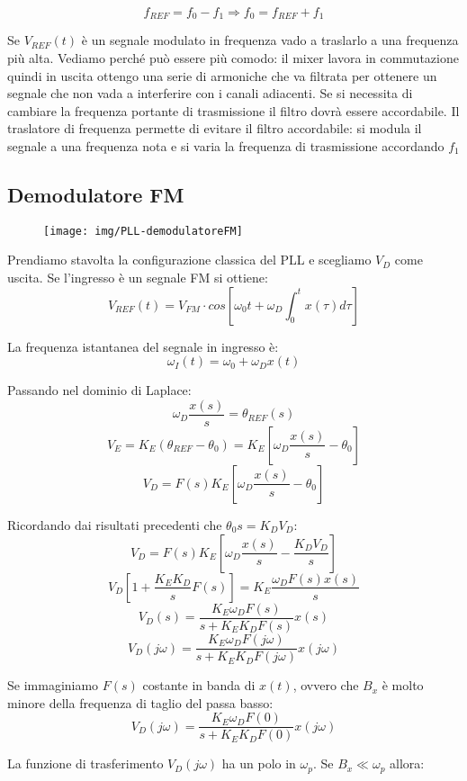 \[ f_{REF} = f_0 - f_1 \Rightarrow f_0 = f_{REF} + f_1 \]

Se $V_{REF}(t)$ è un segnale modulato in frequenza vado a traslarlo a una frequenza più alta. Vediamo perché può essere più comodo: il mixer lavora in commutazione quindi in uscita ottengo una serie di armoniche che va filtrata per ottenere un segnale che non vada a interferire con i canali adiacenti. Se si necessita di cambiare la frequenza portante di trasmissione il filtro dovrà essere accordabile. Il traslatore di frequenza permette di evitare il filtro accordabile: si modula il segnale a una frequenza nota e si varia la frequenza di trasmissione accordando $f_1$

\subsection{Demodulatore FM}
\begin{figure}[htb]
	\centering
	\texttt{[image: img/PLL-demodulatoreFM]}
	\caption{}
	\label{fig:pll-traslatore}
\end{figure}

Prendiamo stavolta la configurazione classica del PLL e scegliamo $V_D$ come uscita. Se l'ingresso è un segnale FM si ottiene:
\[V_{REF}(t) = V_{FM} \cdot cos\left[ \omega_0 t + \omega_D \int_{0}^{t} x(\tau) d\tau \right]  \]

La frequenza istantanea del segnale in ingresso è:
\[ \omega_I (t) = \omega_0 + \omega_D x(t) \]

Passando nel dominio di Laplace:
\[\omega_D \frac{x(s)}{s} = \theta_{REF}(s)  \]
\[V_E = K_E (\theta_{REF} - \theta_0) = K_E \left[\omega_D \frac{x(s)}{s} - \theta_0\right] \]
\[V_D = F(s) K_E \left[\omega_D \frac{x(s)}{s} - \theta_0\right] \]

Ricordando dai risultati precedenti che $\theta_0 s = K_D V_D $:
\[V_D = F(s) K_E \left[\omega_D \frac{x(s)}{s} - \frac{K_D V_D}{s} \right] \]
\[V_D \left[ 1+\frac{K_E K_D}{s} F(s) \right] = K_E \frac{\omega_D F(s)x(s)}{s}  \]
\[V_D(s) = \frac{K_E \omega_D F(s)}{s+K_E K_D F(s)} x(s) \]
\[V_D(j\omega) = \frac{K_E \omega_D F(j\omega)}{s+K_E K_D F(j\omega)} x(j\omega) \]

Se immaginiamo $F(s)$ costante in banda di $x(t)$, ovvero che $B_x$ è molto minore della frequenza di taglio del passa basso:
\[ V_D(j\omega) = \frac{K_E \omega_D F(0)}{s+K_E K_D F(0)} x(j\omega) \]

La funzione di trasferimento $V_D (j\omega)$ ha un polo in $\omega_p$. Se $B_x \ll \omega_p$ allora:

